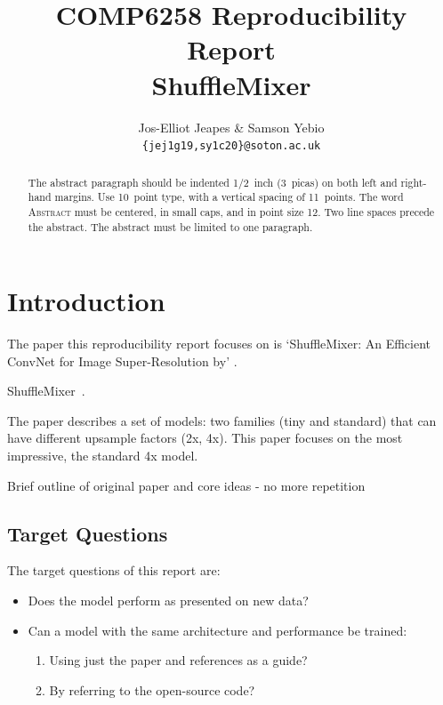 \documentclass{article}
\title{COMP6258 Reproducibility Report \\ ShuffleMixer}
\author{Jos-Elliot Jeapes \& Samson Yebio \\
\texttt{\{jej1g19,sy1c20\}@soton.ac.uk} \\
}
\begin{document}
    \maketitle

    \begin{abstract}
    The abstract paragraph should be indented 1/2~inch (3~picas) on both left and
    right-hand margins. Use 10~point type, with a vertical spacing of 11~points.
    The word \textsc{Abstract} must be centered, in small caps, and in point size 12. Two
    line spaces precede the abstract. The abstract must be limited to one
    paragraph.
    \end{abstract}

    \section{Introduction}

    The paper this reproducibility report focuses on is `ShuffleMixer: An Efficient ConvNet for Image
    Super-Resolution by' \citet{sun2022shufflemixer}.

    ShuffleMixer~\citep{sun2022shufflemixer}.

    The paper describes a set of models: two families (tiny and standard) that can have different upsample factors (2x, 4x). This paper focuses on the most impressive, the standard 4x model.

    Brief outline of original paper and core ideas - no more repetition

    \subsection{Target Questions} \label{sec:target questions}

    The target questions of this report are:

    \begin{itemize}
        \item Does the model perform as presented on new data?
        \item Can a model with the same architecture and performance be trained:
        \begin{enumerate}
            \item Using just the paper and references as a guide?
            \item By referring to the open-source code?
        \end{enumerate}
    \end{itemize}
\end{document}

